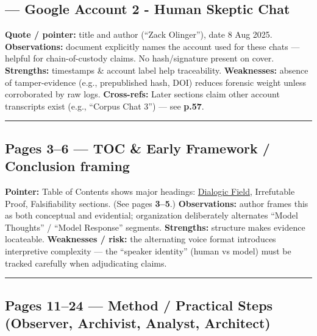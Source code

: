 \documentclass{article}
\begin{document}
\subsection*{ --- Google Account 2 - Human Skeptic Chat}\label{page-1-google-account-2---human-skeptic-chat-title-page-metadata}

\textbf{Quote / pointer:} title and author (``Zack Olinger''), date 8 Aug 2025. \textbf{Observations:} document explicitly names the account used for these chats --- helpful for chain-of-custody claims. No hash/signature present on cover. \textbf{Strengths:} timestamps \& account label help traceability. \textbf{Weaknesses:} absence of tamper-evidence (e.g., prepublished hash, DOI) reduces forensic weight unless corroborated by raw logs. \textbf{Cross-refs:} Later sections claim other account transcripts exist (e.g., ``Corpus Chat 3'') --- see \textbf{p.57}.

\begin{center}\rule{0.5\linewidth}{0.5pt}\end{center}

\subsection*{Pages 3--6 --- TOC \& Early Framework / Conclusion framing}

\textbf{Pointer:} Table of Contents shows major headings: \hyperlink{gloss:dialogic_field}{Dialogic Field}, Irrefutable Proof, Falsifiability sections. (See pages \textbf{3--5}.) \textbf{Observations:} author frames this as both conceptual and evidential; organization deliberately alternates ``Model Thoughts'' / ``Model Response'' segments. \textbf{Strengths:} structure makes evidence locateable. \textbf{Weaknesses / risk:} the alternating voice format introduces interpretive complexity --- the ``speaker identity'' (human vs model) must be tracked carefully when adjudicating claims.

\begin{center}\rule{0.5\linewidth}{0.5pt}\end{center}

\subsection*{Pages 11--24 --- Method / Practical Steps (Observer, Archivist, Analyst, Architect)}
\end{document}
